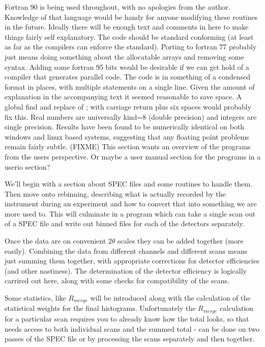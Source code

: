 \documentclass[10pt,a4paper,notitlepage]{article}
\begin{document}
Fortran 90 is being used throughout, with no apologies from the author.
Knowledge of that language would be handy for anyone modifying these routines
in the future. Ideally there will be enough text and comments in here to 
make things fairly self explanatory. 
The code should be standard conforming (at least as far as the compilers 
can enforce the standard). 
Porting to fortran 77  probably just means doing 
something about the allocatable arrays and removing some syntax.
Adding some fortran 95 bits would be desirable if we can get hold of a
compiler that generates parallel code. 
The code is in something of a condensed format in places, with multiple 
statements on a single line. 
Given the amount of explanation in the accompanying text it seemed 
reasonable to save space. A global 
find and replace of ; with carriage return plus six spaces would probably 
fix this. 
Real numbers are universally kind=8 (double precision) and integers are 
single precision. 
Results have been found to be numerically identical on both windows 
and linux based systems, suggesting that any floating point problems
remain fairly subtle.
(FIXME) This section wants an overview of the programs from the users 
perspective. Or maybe a user manual section for the programs in a userio 
section?

We'll begin with a section about SPEC files and some routines to handle them.
Then move onto rebinning, describing what is actually 
recorded by the instrument during an experiment and how to convert that
into something we are more used to. This will culminate in a program which can
take a single scan out of a SPEC file and write out binned files for each 
of the detectors separately. 

Once the data are on convenient 2$\theta$ scales they can be added 
together (more easily). 
Combining the data from different channels and different scans means just summing them together, with appropriate corrections for detector efficiencies 
(and other nastiness). 
The determination of the detector efficiency is logically carrired out here, 
along with some checks for compatibility of the scans.  

Some statistics, like $R_{merge}$ will be introduced along with the 
calculation of the statistical weights for the final histograms. 
Unfortunately the $R_{merge}$ calculation for a particular scan requires 
you to already know how the total looks, so that needs access to both 
individual scans and the summed total - can be done on two passes 
of the SPEC file or by processing the scans separately and then together.
\end{document}
